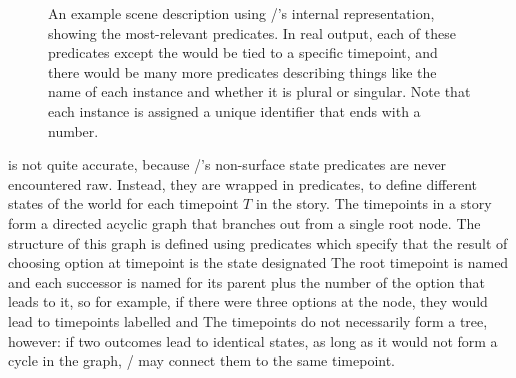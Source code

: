 \begin{figure}[!b]
\centering
{}
\caption[\dunyazad/ state example]{An example scene description using \dunyazad/'s internal representation, showing the most-relevant predicates. In real output, each of these predicates except the  would be tied to a specific timepoint, and there would be many more  predicates describing things like the name of each instance and whether it is plural or singular. Note that each instance is assigned a unique identifier that ends with a number.}
\label{fig:dunyazad-state-example}
\end{figure}


 is not quite accurate, because \dunyazad/'s non-surface state predicates are never encountered raw.
%
Instead, they are wrapped in  predicates, to define different states of the world for each timepoint $T$ in the story.
%
The timepoints in a story form a directed acyclic graph that branches out from a single root node.
%
The structure of this graph is defined using  predicates which specify that the result of choosing option  at timepoint  is the state designated 
%
The root timepoint is named  and each successor is named for its parent plus the number of the option that leads to it, so for example, if there were three options at the  node, they would lead to timepoints labelled   and 
%
The timepoints do not necessarily form a tree, however: if two outcomes lead to identical states, as long as it would not form a cycle in the graph, \dunyazad/ may connect them to the same timepoint.


